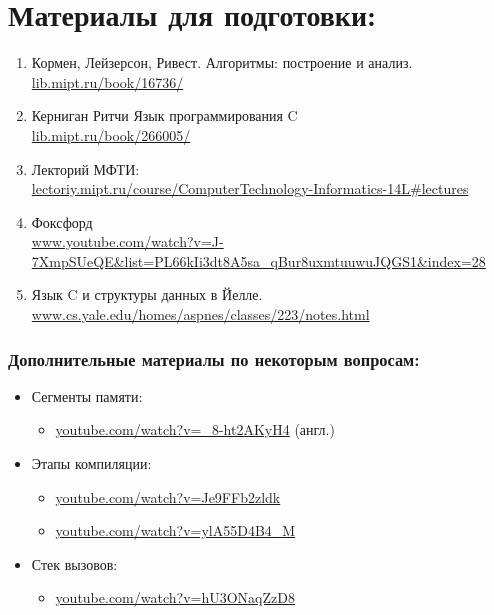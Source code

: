 \documentclass{article}
\begin{document}
\newpage
\section*{Материалы для подготовки:}
\begin{enumerate}
\item Кормен, Лейзерсон, Ривест. Алгоритмы: построение и анализ.\\ 
\hspace*{16pt} \href{https://lib.mipt.ru/book/16736/}{lib.mipt.ru/book/16736/}
\item Керниган Ритчи Язык программирования C \\
\hspace*{16pt} \href{https://lib.mipt.ru/book/266005/}{lib.mipt.ru/book/266005/}
\item Лекторий МФТИ: \\ \hspace*{16pt} 
\href{http://lectoriy.mipt.ru/course/ComputerTechnology-Informatics-14L#lectures}
{lectoriy.mipt.ru/course/ComputerTechnology-Informatics-14L\#lectures}
\item Фоксфорд\\
\href{https://www.youtube.com/watch?v=J-7XmpSUeQE&list=PL66kIi3dt8A5sa_qBur8uxmtuuwuJQGS1&index=28}
{www.youtube.com/watch?v=J-7XmpSUeQE\&list=PL66kIi3dt8A5sa\_qBur8uxmtuuwuJQGS1\&index=28}
\item Язык C и структуры данных в Йелле.\\ \hspace*{16pt} \href{http://www.cs.yale.edu/homes/aspnes/classes/223/notes.html}{www.cs.yale.edu/homes/aspnes/classes/223/notes.html}
\end{enumerate}

\subsubsection*{Дополнительные материалы по некоторым вопросам:}
\begin{itemize}

\item Сегменты памяти:
\begin{itemize}
\item \href{https://www.youtube.com/watch?v=_8-ht2AKyH4}{youtube.com/watch?v=\_8-ht2AKyH4}  (англ.)
\end{itemize}
\item Этапы компиляции:
\begin{itemize}
\item \href{https://www.youtube.com/watch?v=Je9FFb2zldk}{youtube.com/watch?v=Je9FFb2zldk}
\item \href{https://www.youtube.com/watch?v=ylA55D4B4_M}{youtube.com/watch?v=ylA55D4B4\_M}
\end{itemize}
\item Стек вызовов:
\begin{itemize}
\item \href{https://www.youtube.com/watch?v=hU3ONaqZzD8}{youtube.com/watch?v=hU3ONaqZzD8}
\end{itemize}


\end{itemize}
\end{document}
